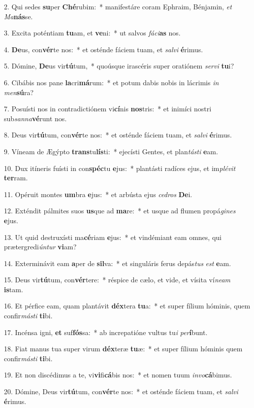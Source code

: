 2. Qui sedes \textbf{su}per \textbf{Ché}rubim:~*  manifestáre coram Ephraim, Bénjamin, \textit{et} \textit{Ma}\textbf{nás}se.\

3. Excita poténtiam \textbf{tu}am, et \textbf{ve}ni:~*  ut salvos \textit{fá}\textit{ci}\textbf{as} nos.\

4. \textbf{De}us, con\textbf{vér}te nos:~*  et osténde fáciem tuam, et \textit{sal}\textit{vi} \textbf{é}rimus.\

5. Dómine, \textbf{De}us vir\textbf{tú}tum,~*  quoúsque irascéris super oratiónem \textit{ser}\textit{vi} \textbf{tu}i?\

6. Cibábis nos pane \textbf{la}cri\textbf{má}rum:~*  et potum dabis nobis in lácrimis \textit{in} \textit{men}\textbf{sú}ra?\

7. Posuísti nos in contradictiónem vi\textbf{cí}nis \textbf{nos}tris:~*  et inimíci nostri sub\textit{san}\textit{na}\textbf{vé}runt nos.\

8. Deus vir\textbf{tú}tum, con\textbf{vér}te nos:~*  et osténde fáciem tuam, et \textit{sal}\textit{vi} \textbf{é}rimus.\

9. Víneam de Ægýpto \textbf{trans}tu\textbf{lís}ti:~*  ejecísti Gentes, et plan\textit{tás}\textit{ti} \textbf{e}am.\

10. Dux itíneris fuísti in con\textbf{spéc}tu \textbf{e}jus:~*  plantásti radíces ejus, et im\textit{plé}\textit{vit} \textbf{ter}ram.\

11. Opéruit montes \textbf{um}bra \textbf{e}jus:~*  et arbústa ejus \textit{ce}\textit{dros} \textbf{De}i.\

12. Exténdit pálmites suos \textbf{us}que ad \textbf{ma}re:~*  et usque ad flumen propá\textit{gi}\textit{nes} \textbf{e}jus.\

13. Ut quid destruxísti ma\textbf{cé}riam \textbf{e}jus:~*  et vindémiant eam omnes, qui prætergredi\textit{ún}\textit{tur} \textbf{vi}am?\

14. Exterminávit eam \textbf{a}per de \textbf{sil}va:~*  et singuláris ferus depás\textit{tus} \textit{est} \textbf{e}am.\

15. Deus vir\textbf{tú}tum, con\textbf{vér}tere:~*  réspice de cælo, et vide, et vísita ví\textit{ne}\textit{am} \textbf{is}tam.\

16. Et pérfice eam, quam plantávit \textbf{déx}tera \textbf{tu}a:~*  et super fílium hóminis, quem confir\textit{más}\textit{ti} \textbf{ti}bi.\

17. Incénsa igni, \textbf{et} suf\textbf{fós}sa:~*  ab increpatióne vultus tu\textit{i} \textit{per}\textbf{í}bunt.\

18. Fiat manus tua super virum \textbf{déx}teræ \textbf{tu}æ:~*  et super fílium hóminis quem confir\textit{más}\textit{ti} \textbf{ti}bi.\

19. Et non discédimus a te, vi\textbf{vi}fi\textbf{cá}bis nos:~*  et nomen tuum \textit{in}\textit{vo}\textbf{cá}bimus.\

20. Dómine, Deus vir\textbf{tú}tum, con\textbf{vér}te nos:~*  et osténde fáciem tuam, et \textit{sal}\textit{vi} \textbf{é}rimus.\

